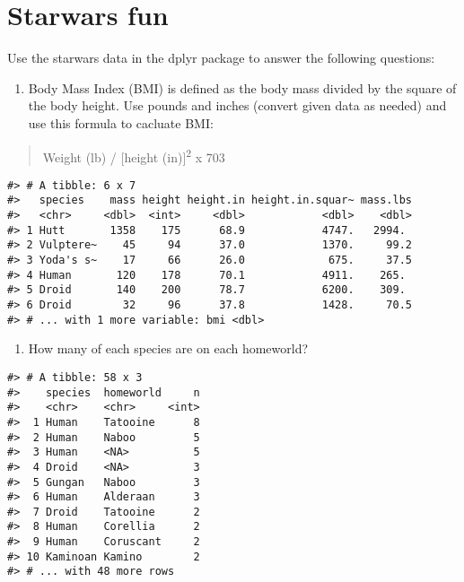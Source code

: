\documentclass[
]{book}
\providecommand{\tightlist}{%
  \setlength{\itemsep}{0pt}\setlength{\parskip}{0pt}}
\begin{document}
\hypertarget{starwars-fun}{%
\section{Starwars fun}\label{starwars-fun}}

Use the starwars data in the dplyr package to answer the following questions:

\begin{enumerate}
\def\labelenumi{\arabic{enumi}.}
\setcounter{enumi}{4}
\tightlist
\item
  Body Mass Index (BMI) is defined as the body mass divided by the square of the body height. Use pounds and inches (convert given data as needed) and use this formula to cacluate BMI:
\end{enumerate}

\begin{quote}
Weight (lb) / {[}height (in){]}\textsuperscript{2} x 703
\end{quote}

\begin{verbatim}
#> # A tibble: 6 x 7
#>   species    mass height height.in height.in.squar~ mass.lbs
#>   <chr>     <dbl>  <int>     <dbl>            <dbl>    <dbl>
#> 1 Hutt       1358    175      68.9            4747.   2994. 
#> 2 Vulptere~    45     94      37.0            1370.     99.2
#> 3 Yoda's s~    17     66      26.0             675.     37.5
#> 4 Human       120    178      70.1            4911.    265. 
#> 5 Droid       140    200      78.7            6200.    309. 
#> 6 Droid        32     96      37.8            1428.     70.5
#> # ... with 1 more variable: bmi <dbl>
\end{verbatim}

\begin{enumerate}
\def\labelenumi{\arabic{enumi}.}
\setcounter{enumi}{5}
\tightlist
\item
  How many of each species are on each homeworld?
\end{enumerate}

\begin{verbatim}
#> # A tibble: 58 x 3
#>    species  homeworld     n
#>    <chr>    <chr>     <int>
#>  1 Human    Tatooine      8
#>  2 Human    Naboo         5
#>  3 Human    <NA>          5
#>  4 Droid    <NA>          3
#>  5 Gungan   Naboo         3
#>  6 Human    Alderaan      3
#>  7 Droid    Tatooine      2
#>  8 Human    Corellia      2
#>  9 Human    Coruscant     2
#> 10 Kaminoan Kamino        2
#> # ... with 48 more rows
\end{verbatim}
\end{document}

